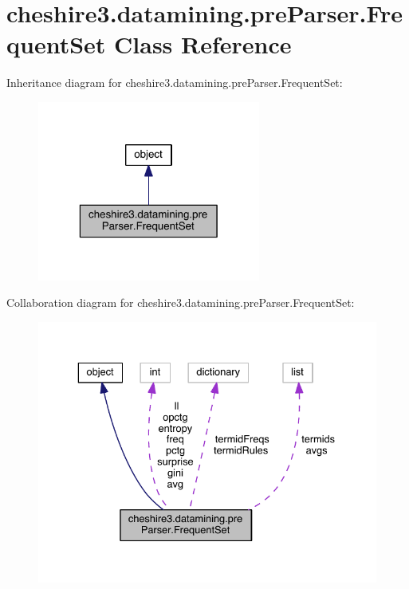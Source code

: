 \hypertarget{classcheshire3_1_1datamining_1_1pre_parser_1_1_frequent_set}{\section{cheshire3.\-datamining.\-pre\-Parser.\-Frequent\-Set Class Reference}
\label{classcheshire3_1_1datamining_1_1pre_parser_1_1_frequent_set}
}


Inheritance diagram for cheshire3.\-datamining.\-pre\-Parser.\-Frequent\-Set\-:
\nopagebreak
\begin{figure}[H]
\begin{center}
\leavevmode
\includegraphics[width=208pt]{classcheshire3_1_1datamining_1_1pre_parser_1_1_frequent_set__inherit__graph}
\end{center}
\end{figure}


Collaboration diagram for cheshire3.\-datamining.\-pre\-Parser.\-Frequent\-Set\-:
\nopagebreak
\begin{figure}[H]
\begin{center}
\leavevmode
\includegraphics[width=332pt]{classcheshire3_1_1datamining_1_1pre_parser_1_1_frequent_set__coll__graph}
\end{center}
\end{figure}
